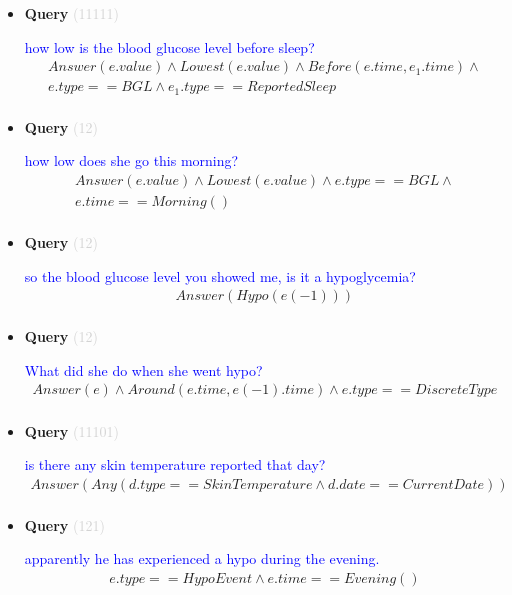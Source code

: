 \documentclass[11pt]{article}
\newcommand{\key}[1]{\textcolor{lightgray}{#1}}
\newcounter{CQuery}
\begin{document}
\begin{itemize}
\item
\textbf{Query\theCQuery} \key{(11111)} \addtocounter{CQuery}{1}
\textcolor{blue}{ how low is the blood glucose level before sleep? }
\begin{multline*}
Answer(e.value) \wedge Lowest(e.value) \wedge Before(e.time, e_1.time) \wedge \\ 
e.type==BGL \wedge e_1.type==ReportedSleep \\ 
\end{multline*}


\item
\textbf{Query\theCQuery} \key{(12)} \addtocounter{CQuery}{1}
\textcolor{blue}{ how low does she go this morning? }
\begin{multline*}
Answer(e.value) \wedge Lowest(e.value) \wedge e.type==BGL \wedge \\ 
e.time==Morning() \\ 
\end{multline*}


\item
\textbf{Query\theCQuery} \key{(12)} \addtocounter{CQuery}{1}
\textcolor{blue}{ so the blood glucose level you showed me, is it a hypoglycemia? }
\begin{multline*}
Answer(Hypo(e(-1))) \\ 
\end{multline*}


\item
\textbf{Query\theCQuery} \key{(12)} \addtocounter{CQuery}{1}
\textcolor{blue}{ What did she do when she went hypo? }
\begin{multline*}
Answer(e) \wedge Around(e.time, e(-1).time) \wedge e.type==DiscreteType \\ 
\end{multline*}


\item
\textbf{Query\theCQuery} \key{(11101)} \addtocounter{CQuery}{1}
\textcolor{blue}{ is there any skin temperature reported that day? }
\begin{multline*}
Answer(Any(d.type==SkinTemperature \wedge d.date==CurrentDate)) \\ 
\end{multline*}


\item
\textbf{Query\theCQuery} \key{(121)} \addtocounter{CQuery}{1}
\textcolor{blue}{ apparently he has experienced a hypo during the evening. }
\begin{multline*}
e.type==HypoEvent \wedge e.time==Evening() \\ 
\end{multline*}



\end{itemize}
\end{document}
